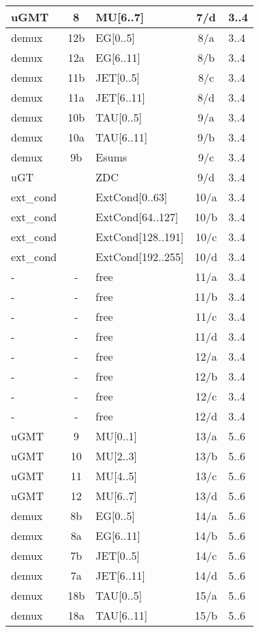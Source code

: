 \begin{longtable}{|l|c|l|c|l|}
uGMT  & 8   & MU[6..7]   & 7/d  & 3..4 \\\hline
demux & 12b & EG[0..5]   & 8/a  & 3..4 \\\hline
demux & 12a & EG[6..11]  & 8/b  & 3..4 \\\hline
demux & 11b & JET[0..5]  & 8/c  & 3..4 \\\hline
demux & 11a & JET[6..11] & 8/d  & 3..4 \\\hline
demux & 10b & TAU[0..5]  & 9/a  & 3..4 \\\hline
demux & 10a & TAU[6..11] & 9/b  & 3..4 \\\hline
demux & 9b  & Esums      & 9/c  & 3..4 \\\hline
uGT &    & ZDC      & 9/d  & 3..4 \\\hline
ext\_cond &     & ExtCond[0..63]    & 10/a & 3..4 \\\hline
ext\_cond &     & ExtCond[64..127]  & 10/b & 3..4 \\\hline
ext\_cond &     & ExtCond[128..191] & 10/c & 3..4 \\\hline
ext\_cond &     & ExtCond[192..255] & 10/d & 3..4 \\\hline
- & - & free & 11/a & 3..4 \\\hline
- & - & free & 11/b & 3..4 \\\hline
- & - & free & 11/c & 3..4 \\\hline
- & - & free & 11/d & 3..4 \\\hline
- & - & free & 12/a & 3..4 \\\hline
- & - & free & 12/b & 3..4 \\\hline
- & - & free & 12/c & 3..4 \\\hline
- & - & free & 12/d & 3..4 \\\hline
\hline
uGMT  & 9   & MU[0..1]   & 13/a & 5..6 \\\hline
uGMT  & 10  & MU[2..3]   & 13/b & 5..6 \\\hline
uGMT  & 11  & MU[4..5]   & 13/c & 5..6 \\\hline
uGMT  & 12  & MU[6..7]   & 13/d & 5..6 \\\hline
demux & 8b  & EG[0..5]   & 14/a & 5..6 \\\hline
demux & 8a  & EG[6..11]  & 14/b & 5..6 \\\hline
demux & 7b  & JET[0..5]  & 14/c & 5..6 \\\hline
demux & 7a  & JET[6..11] & 14/d & 5..6 \\\hline
demux & 18b & TAU[0..5]  & 15/a & 5..6 \\\hline
demux & 18a & TAU[6..11] & 15/b & 5..6 \\\hline

\end{longtable}
